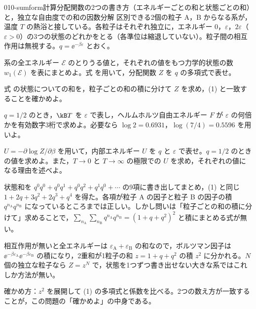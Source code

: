 \documentclass[uplatex,dvipdfmx,a4paper,11pt]{jsarticle}
\begin{document}
\mondaihen
{}
\begin{mondai}{010-sumform}{計算}{分配関数の2つの書き方（エネルギーごとの和と状態ごとの和）と，独立な自由度での和の因数分解}
区別できる2個の粒子 A，B からなる系が，温度 $T$ の熱浴と接している。各粒子はそれぞれ独立に，エネルギー $0$，$\varepsilon$，$2\varepsilon$（$\varepsilon>0$）の3つの状態のどれかをとる（各準位は縮退していない）。粒子間の相互作用は無視する。$q=\ee^{-\beta\varepsilon}$ とおく。
\begin{shoumon}
  \item 系の全エネルギー $\mathcal{E}$ のとりうる値と，それぞれの値をもつ力学的状態の数 $w_{1}(\mathcal{E})$ を表にまとめよ。式 を用いて，分配関数 $Z$ を $q$ の多項式で表せ。
  \item 式 の状態についての和を，粒子ごとの和の積に分けて $Z$ を求め，(1) と一致することを確かめよ。
  \item $q=1/2$ のとき，$\kB T$ を $\varepsilon$ で表し，ヘルムホルツ自由エネルギー $F$ が $\varepsilon$ の何倍かを有効数字3桁で求めよ。必要なら $\log2=\num{0.6931}$，$\log(7/4)=\num{0.5596}$ を用いよ。
  \item $U=-\partial\log Z/\partial\beta$ を用いて，内部エネルギー $U$ を $q$ と $\varepsilon$ で表せ。$q=1/2$ のときの値を求めよ。また，$T\to0$ と $T\to\infty$ の極限での $U$ を求め，それぞれの値になる理由を述べよ。
\end{shoumon}

\begin{kotaeran}
   状態和を $q^{0}q^{0}+q^{0}q^{1}+q^{0}q^{2}+q^{1}q^{0}+\cdots$ の9項に書き出してまとめ，(1) と同じ $1+2q+3q^{2}+2q^{3}+q^{4}$ を得た。各項が粒子 A の因子と粒子 B の因子の積 $q^{n_{\mathrm{A}}}q^{n_{\mathrm{B}}}$ になっているところまでは正しい。しかし問いは「粒子ごとの和の積に分けて」求めることで，$\sum_{n_{\mathrm{A}}}\sum_{n_{\mathrm{B}}}q^{n_{\mathrm{A}}}q^{n_{\mathrm{B}}}=(1+q+q^{2})^{2}$ と積にまとめる式が無い。
\end{kotaeran}
\begin{rikai}
  \item 相互作用が無いと全エネルギーは $\varepsilon_{\mathrm{A}}+\varepsilon_{\mathrm{B}}$ の和なので，ボルツマン因子は $\ee^{-\beta\varepsilon_{\mathrm{A}}}\ee^{-\beta\varepsilon_{\mathrm{B}}}$ の積になり，2重和が1粒子の和 $z=1+q+q^{2}$ の積 $z^{2}$ に分かれる。$N$ 個の独立な粒子なら $Z=z^{N}$ で，状態を1つずつ書き出せない大きな系ではこれしか方法が無い。
  \item 確かめ方：$z^{2}$ を展開して (1) の多項式と係数を比べる。2つの数え方が一致することが，この問題の「確かめよ」の中身である。
\end{rikai}
\end{mondai}
\end{document}
